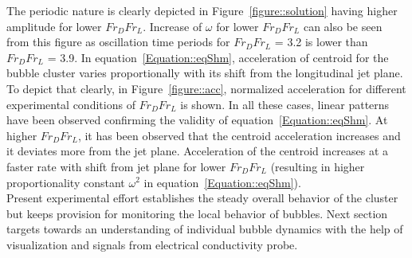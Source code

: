 The periodic nature is clearly depicted in Figure~\ref{figure::solution} having higher amplitude for lower $Fr_DFr_L$. Increase of $\omega$ for lower $Fr_DFr_L$ can also be seen from this figure as oscillation time periods for $Fr_DFr_L$ = 3.2 is lower than $Fr_DFr_L$ = 3.9. In equation~\ref{Equation::eqShm}, acceleration of centroid for the bubble cluster varies proportionally with its shift from the longitudinal jet plane. To depict that clearly, in Figure~\ref{figure::acc}, normalized acceleration for different experimental conditions of $Fr_DFr_L$ is shown. In all these cases, linear patterns have been observed confirming the validity of equation~\ref{Equation::eqShm}. At higher $Fr_DFr_L$, it has been observed that the centroid acceleration increases and it deviates more from the jet plane. Acceleration of the centroid increases at a faster rate with shift from jet plane for lower $Fr_DFr_L$ (resulting in higher proportionality constant $ \omega^2 $ in equation~\ref{Equation::eqShm}). \\
Present experimental effort establishes the steady overall behavior of the cluster but keeps provision for monitoring the local behavior of bubbles. Next section targets towards an understanding of individual bubble dynamics with the help of visualization and signals from electrical conductivity probe.
